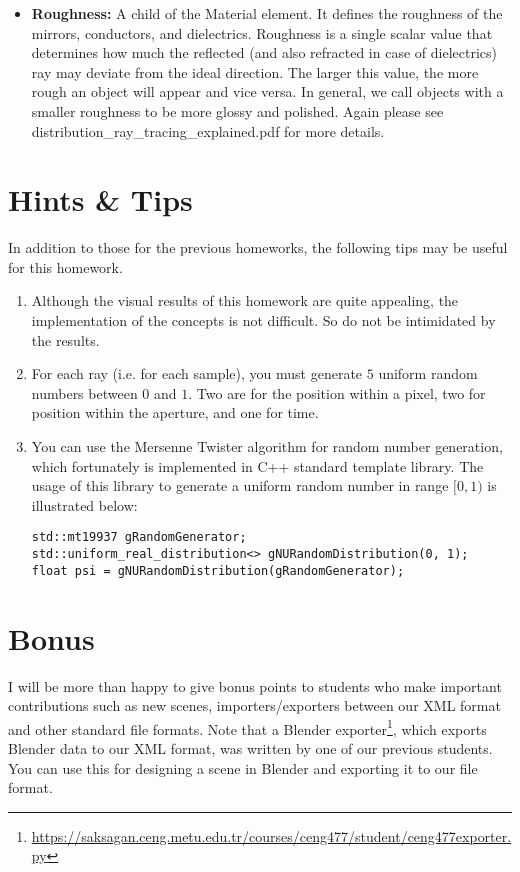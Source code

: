 \documentclass[12pt]{article}
\begin{document}
\begin{itemize}
\item \textbf{Roughness:} A child of the Material element. It defines
the roughness of the mirrors, conductors, and dielectrics. 
Roughness is a single scalar value that determines how much
the reflected (and also refracted in case of dielectrics) ray may deviate from the ideal direction. The
larger this value, the more rough an object will appear and vice
versa. In general, we call objects with a smaller roughness to be more
glossy and polished. Again please see 
distribution\_ray\_tracing\_explained.pdf for more details.

\end{itemize}

\section{Hints \& Tips}
In addition to those for the previous homeworks, the following tips may
be useful for this homework.

\begin{enumerate}
\item \textbf{} Although the visual results of this homework are quite
appealing, the implementation of the concepts is not difficult. So do
not be intimidated by the results.

\item \textbf{} For each ray (i.e. for each sample), you must generate
$5$ uniform random numbers between $0$ and $1$. Two are for the position
within a pixel, two for position within the aperture, and one for time.

\item \textbf{} You can use the Mersenne Twister algorithm for random
number generation, which fortunately is implemented in 
C++ standard template library. The usage of this library to generate a
uniform random number in range $[0, 1)$ is illustrated below:

\begin{verbatim}
std::mt19937 gRandomGenerator;
std::uniform_real_distribution<> gNURandomDistribution(0, 1);
float psi = gNURandomDistribution(gRandomGenerator);
\end{verbatim}

\end{enumerate}

\section{Bonus}

I will be more than happy to give bonus points to students who
make important contributions such as new scenes, importers/exporters
between our XML format and other standard file formats. Note that a
Blender
exporter\footnote{\url{https://saksagan.ceng.metu.edu.tr/courses/ceng477/student/ceng477exporter.py}},
which exports Blender data to our XML format, was written by one of our
previous students. You can use this for designing a scene in Blender and
exporting it to our file format.
\end{document}
